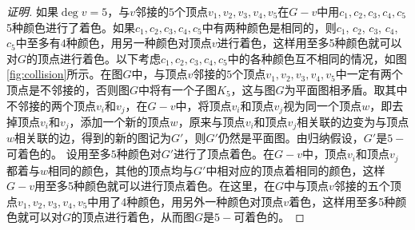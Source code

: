 \documentclass{article}
\begin{document}
\begin{CJK}{UTF8}{gbsn}
\begin{proof}[证明]
  如果$\deg v = 5$，与$v$邻接的$5$个顶点$v_1,v_2,v_3,v_4,v_5$在$G-v$中用$c_1,c_2,c_3,c_4,c_5$ 5种颜色进行了着色。如果$c_1,c_2,c_3,c_4,c_5$中有两种颜色是相同的，则$c_1$, $c_2$, $c_3$, $c_4$, $c_5$中至多有$4$种颜色，用另一种颜色对顶点$v$进行着色，这样用至多5种颜色就可以对$G$的顶点进行着色。以下考虑$c_1,c_2,c_3,c_4,c_5$中的各种颜色互不相同的情况，如图\ref{fig:collision}所示。在图$G$中，与顶点$v$邻接的$5$个顶点$v_1,v_2,v_3,v_4,v_5$中一定有两个顶点是不邻接的，否则图$G$中将有一个子图$K_5$，这与图$G$为平面图相矛盾。取其中不邻接的两个顶点$v_i$和$v_j$，在$G-v$中，将顶点$v_i$和顶点$v_j$视为同一个顶点$w$，即去掉顶点$v_i$和$v_j$，添加一个新的顶点$w$，原来与顶点$v_i$和顶点$v_j$相关联的边变为与顶点$w$相关联的边，得到的新的图记为$G'$，则$G'$仍然是平面图。由归纳假设，$G'$是$5-$可着色的。 设用至多$5$种颜色对$G'$进行了顶点着色。在$G-v$中，顶点$v_i$和顶点$v_j$都着与$w$相同的颜色，其他的顶点均与$G'$中相对应的顶点着相同的颜色，这样$G-v$用至多5种颜色就可以进行顶点着色。在这里，在$G$中与顶点$v$邻接的五个顶点$v_1,v_2,v_3,v_4,v_5$中用了4种颜色，用另外一种颜色对顶点$v$着色，这样用至多5种颜色就可以对$G$的顶点进行着色，从而图$G$是$5-$可着色的。

  
\end{proof}
\end{CJK}
\end{document}
